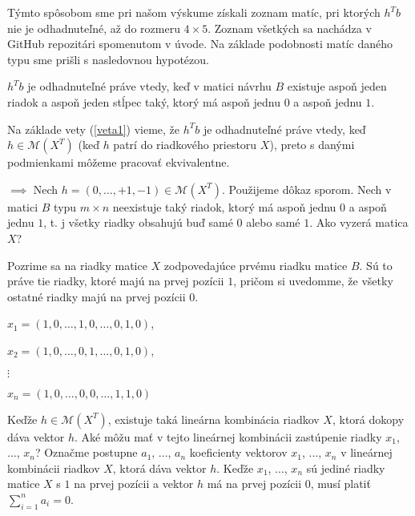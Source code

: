 Týmto spôsobom sme pri našom výskume získali zoznam matíc, pri ktorých $h^T b$ nie je odhadnuteľné, až do rozmeru $4 \times 5$.
Zoznam všetkých sa nachádza v GitHub repozitári spomenutom v úvode. 
Na základe podobnosti matíc daného typu sme prišli s nasledovnou hypotézou.

\begin{hypoteza}
$h^T b$ je odhadnuteľné práve vtedy, keď v matici návrhu $B$ existuje aspoň jeden riadok a aspoň jeden stĺpec taký,
ktorý má aspoň jednu $0$ a aspoň jednu $1$.
\end{hypoteza}

\begin{dokaz}
Na základe vety (\ref{veta1}) vieme, že $h^T b$ je odhadnuteľné práve vtedy, keď $h \in \mathcal{M}(X^T)$
(keď $h$ patrí do riadkového priestoru $X$),
preto s danými podmienkami môžeme pracovať ekvivalentne.

$\boxed{\implies}$ Nech $h = (0, \ldots, +1, -1) \in \mathcal{M}(X^T)$. Použijeme dôkaz sporom. 
Nech v matici $B$ typu $m \times n$ neexistuje taký riadok, ktorý má aspoň jednu $0$ a aspoň jednu $1$,
t. j všetky riadky obsahujú buď samé $0$ alebo samé $1$.
Ako vyzerá matica $X$?

Pozrime sa na riadky matice $X$ zodpovedajúce prvému riadku matice $B$.
Sú to práve tie riadky, ktoré majú na prvej pozícii $1$, pričom si uvedomme, že všetky ostatné riadky majú na prvej pozícii $0$.

\begin{center}
$
x_1 = (1, 0, \ldots, 1, 0, \ldots, 0, 1, 0)
$,
\end{center}
\begin{center}
$
x_2 = (1, 0, \ldots, 0, 1, \ldots, 0, 1, 0)
$,
\end{center}
\begin{center}
$\vdots$
\end{center}
\begin{center}
$
x_n = (1, 0, \ldots, 0, 0, \ldots, 1, 1, 0)
$
\end{center}

Keďže $h \in \mathcal{M}(X^T)$, existuje taká lineárna kombinácia riadkov $X$, ktorá dokopy dáva vektor $h$.
Aké môžu mať v tejto lineárnej kombinácii zastúpenie riadky $x_1$, ..., $x_n$?
Označme postupne $a_1$, ..., $a_n$ koeficienty vektorov $x_1$, ..., $x_n$ v lineárnej kombinácii riadkov $X$, ktorá dáva vektor $h$.
Keďže $x_1$, ..., $x_n$ sú jediné riadky matice $X$ s $1$ na prvej pozícii a vektor $h$ má na prvej pozícii $0$,
musí platiť $\sum_{i = 1}^n a_i = 0$.


\end{dokaz}
